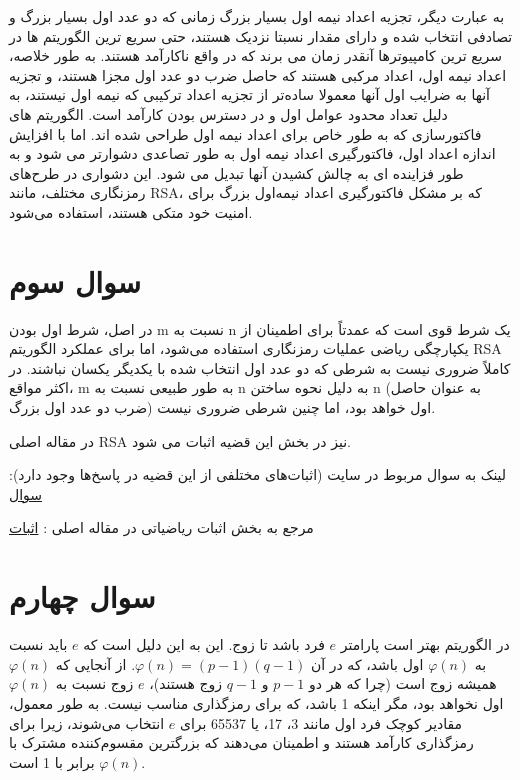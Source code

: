 \documentclass{report}
\begin{document}
به عبارت دیگر، تجزیه اعداد نیمه اول بسیار بزرگ زمانی که دو عدد اول بسیار بزرگ و تصادفی انتخاب شده و دارای مقدار نسبتا نزدیک هستند، حتی سریع ترین الگوریتم ها در سریع ترین کامپیوترها آنقدر زمان می برند که در واقع ناکارآمد هستند.
به طور خلاصه، اعداد نیمه اول، اعداد مرکبی هستند که حاصل ضرب دو عدد اول مجزا هستند، و تجزیه آنها به ضرایب اول آنها معمولا ساده‌تر از تجزیه اعداد ترکیبی که نیمه اول نیستند، به دلیل تعداد محدود عوامل اول و در دسترس بودن کارآمد است. الگوریتم های فاکتورسازی که به طور خاص برای اعداد نیمه اول طراحی شده اند. اما با افزایش اندازه اعداد اول، فاکتورگیری اعداد نیمه اول به طور تصاعدی دشوارتر می شود و به طور فزاینده ای به چالش کشیدن آنها تبدیل می شود. این دشواری در طرح‌های رمزنگاری مختلف، مانند RSA، که بر مشکل فاکتورگیری اعداد نیمه‌اول بزرگ برای امنیت خود متکی هستند، استفاده می‌شود.

\section{سوال سوم}

در اصل، شرط اول بودن m نسبت به n یک شرط قوی است که عمدتاً برای اطمینان از یکپارچگی ریاضی عملیات رمزنگاری استفاده می‌شود، اما برای عملکرد الگوریتم RSA کاملاً ضروری نیست به شرطی که دو عدد اول انتخاب شده با یکدیگر یکسان نباشند. در اکثر مواقع، m به طور طبیعی نسبت به n به دلیل نحوه ساختن n (به عنوان حاصل ضرب دو عدد اول بزرگ) اول خواهد بود، اما چنین شرطی ضروری نیست.

در مقاله اصلی RSA نیز در بخش  این قضیه اثبات می شود. 

لینک به سوال مربوط در سایت  (اثبات‌های مختلفی از این قضیه در پاسخ‌ها وجود دارد):
\href{https://crypto.stackexchange.com/questions/1004/does-rsa-work-for-any-message-m/}{سوال}

مرجع به بخش اثبات ریاضیاتی در مقاله اصلی  :
\href{https://people.csail.mit.edu/rivest/Rsapaper.pdf#page=7}{اثبات}

\section{سوال چهارم}

در الگوریتم  بهتر است پارامتر \( e \) فرد باشد تا زوج. این به این دلیل است که \( e \) باید نسبت به \( \varphi(n) \) اول باشد، که در آن \( \varphi(n) = (p-1)(q-1) \). از آنجایی که \( \varphi(n) \) همیشه زوج است (چرا که هر دو \( p-1 \) و \( q-1 \) زوج هستند)، \( e \) زوج نسبت به \( \varphi(n) \) اول نخواهد بود، مگر اینکه 1 باشد، که برای رمزگذاری مناسب نیست. به طور معمول، مقادیر کوچک فرد اول مانند 3، 17، یا 65537 برای \( e \) انتخاب می‌شوند، زیرا برای رمزگذاری کارآمد هستند و اطمینان می‌دهند که بزرگترین مقسوم‌کننده مشترک با \( \varphi(n) \) برابر با 1 است.
\end{document}
